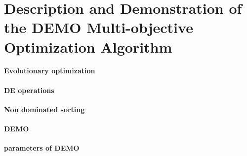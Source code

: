 \section{Description and Demonstration of the DEMO Multi-objective Optimization Algorithm}
\paragraph{Evolutionary optimization}
\paragraph{DE operations}
\paragraph{Non dominated sorting}
\paragraph{DEMO}
\paragraph{parameters of DEMO}
